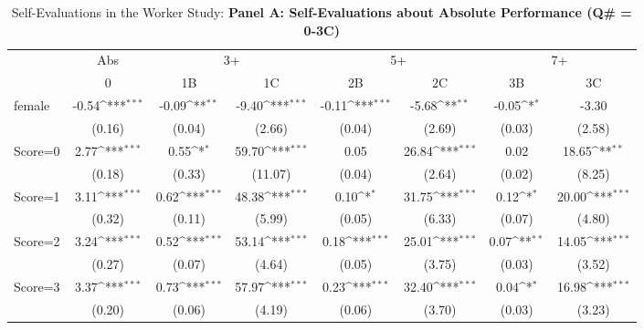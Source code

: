 \begin{table}[htbp]\centering
\def\sym#1{\ifmmode^{#1}\else\(^{#1}\)\fi}
\caption{Self-Evaluations in the Worker Study: \textbf{Panel A: Self-Evaluations about Absolute Performance (Q\# = 0-3C)}}
\begin{tabular}{l*{7}{c}}
\hline\hline
                &\multicolumn{1}{c}{Abs}&\multicolumn{2}{c}{3+}               &\multicolumn{2}{c}{5+}               &\multicolumn{2}{c}{7+}               \\\cmidrule(lr){2-2}\cmidrule(lr){3-4}\cmidrule(lr){5-6}\cmidrule(lr){7-8}
                &\multicolumn{1}{c}{0}&\multicolumn{1}{c}{1B}&\multicolumn{1}{c}{1C}&\multicolumn{1}{c}{2B}&\multicolumn{1}{c}{2C}&\multicolumn{1}{c}{3B}&\multicolumn{1}{c}{3C}\\
\hline
female          &    -0.54\sym{***}&    -0.09\sym{**} &    -9.40\sym{***}&    -0.11\sym{***}&    -5.68\sym{**} &    -0.05\sym{*}  &    -3.30         \\
                &   (0.16)         &   (0.04)         &   (2.66)         &   (0.04)         &   (2.69)         &   (0.03)         &   (2.58)         \\
Score=0         &     2.77\sym{***}&     0.55\sym{*}  &    59.70\sym{***}&     0.05         &    26.84\sym{***}&     0.02         &    18.65\sym{**} \\
                &   (0.18)         &   (0.33)         &  (11.07)         &   (0.04)         &   (2.64)         &   (0.02)         &   (8.25)         \\
Score=1         &     3.11\sym{***}&     0.62\sym{***}&    48.38\sym{***}&     0.10\sym{*}  &    31.75\sym{***}&     0.12\sym{*}  &    20.00\sym{***}\\
                &   (0.32)         &   (0.11)         &   (5.99)         &   (0.05)         &   (6.33)         &   (0.07)         &   (4.80)         \\
Score=2         &     3.24\sym{***}&     0.52\sym{***}&    53.14\sym{***}&     0.18\sym{***}&    25.01\sym{***}&     0.07\sym{**} &    14.05\sym{***}\\
                &   (0.27)         &   (0.07)         &   (4.64)         &   (0.05)         &   (3.75)         &   (0.03)         &   (3.52)         \\
Score=3         &     3.37\sym{***}&     0.73\sym{***}&    57.97\sym{***}&     0.23\sym{***}&    32.40\sym{***}&     0.04\sym{*}  &    16.98\sym{***}\\
                &   (0.20)         &   (0.06)         &   (4.19)         &   (0.06)         &   (3.70)         &   (0.03)         &   (3.23)         \\

\end{tabular}
\end{table}
